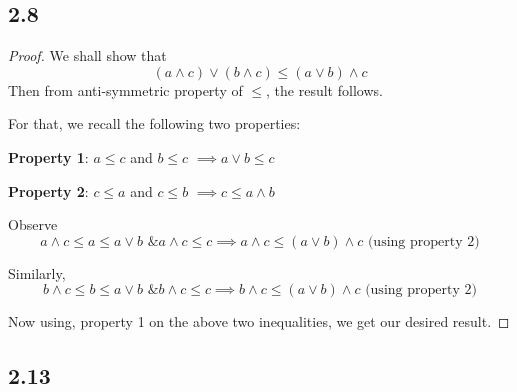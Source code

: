 \documentclass[12pt]{article}
\begin{document}
\subsection*{2.8}

\begin{proof}
We shall show that 
$$(a \wedge c) \vee (b \wedge c) \leq (a \vee b) \wedge c$$ 
Then from anti-symmetric property of $\leq$, the result follows.

For that, we recall the following two properties:

\textbf{Property 1}: $a \leq c$ and $b \leq c$ $\implies a \vee b \leq c$

\textbf{Property 2}: $c \leq a$ and $c \leq b$ $\implies c \leq a \wedge b$

Observe 
$$a \wedge c \leq a \leq a \vee b \text{ \& } a \wedge c \leq c \implies a \wedge c \leq (a \vee b) \wedge c \text{ (using property 2)}$$

Similarly,
$$b \wedge c \leq b \leq a \vee b \text{ \& } b \wedge c \leq c \implies b \wedge c \leq (a \vee b) \wedge c \text{ (using property 2)}$$

Now using, property 1 on the above two inequalities, we get our desired result.

\end{proof}

\subsection*{2.13}
\end{document}
